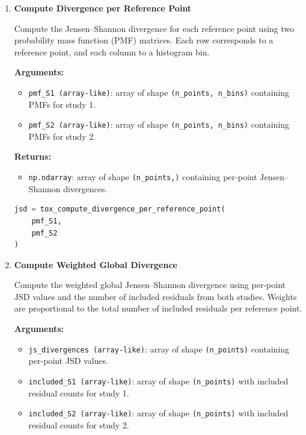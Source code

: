 \begin{enumerate}
    \item \textbf{Compute Divergence per Reference Point}

        Compute the Jensen–Shannon divergence for each reference point using two probability mass function (PMF) matrices.  
        Each row corresponds to a reference point, and each column to a histogram bin.

        \textbf{Arguments:}
        \begin{itemize}
            \item \lstinline!pmf_S1 (array-like)!: array of shape \lstinline!(n_points, n_bins)! containing PMFs for study 1.
            \item \lstinline!pmf_S2 (array-like)!: array of shape \lstinline!(n_points, n_bins)! containing PMFs for study 2.
        \end{itemize}

        \textbf{Returns:}
        \begin{itemize}
            \item \lstinline!np.ndarray!: array of shape \lstinline!(n_points,)! containing per‑point Jensen–Shannon divergences.
        \end{itemize}

        \begin{lstlisting}[language=Python, caption={Per‑Point JSD Computation}]
jsd = tox_compute_divergence_per_reference_point(
    pmf_S1,
    pmf_S2
)
        \end{lstlisting}


    \item \textbf{Compute Weighted Global Divergence}

        Compute the weighted global Jensen–Shannon divergence using per‑point JSD values and the number of included residuals from both studies.  
        Weights are proportional to the total number of included residuals per reference point.

        \textbf{Arguments:}
        \begin{itemize}
            \item \lstinline!js_divergences (array-like)!: array of shape \lstinline!(n_points)! containing per‑point JSD values.
            \item \lstinline!included_S1 (array-like)!: array of shape \lstinline!(n_points)! with included residual counts for study 1.
            \item \lstinline!included_S2 (array-like)!: array of shape \lstinline!(n_points)! with included residual counts for study 2.
        \end{itemize}


\end{enumerate}
